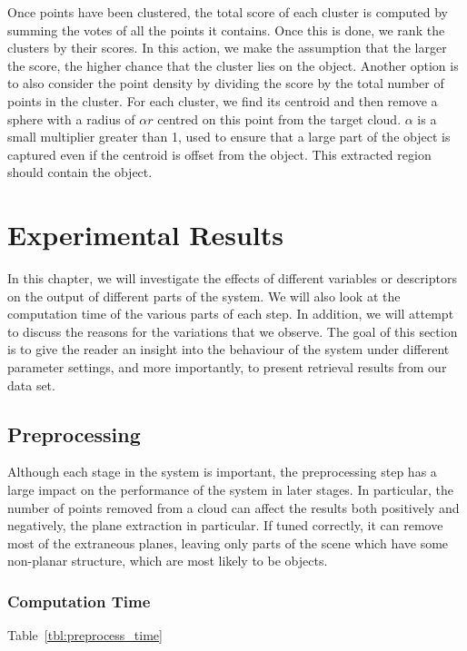 \documentclass[11pt,a4paper]{kth-mag}
\begin{document}
Once points have been clustered, the total score of each cluster is computed by
summing the votes of all the points it contains. Once this is done, we rank the
clusters by their scores. In this action, we make the assumption that the larger
the score, the higher chance that the cluster lies on the object. Another option
is to also consider the point density by dividing the score by the total number
of points in the cluster. For each cluster, we find its centroid and then remove
a sphere with a radius of $\alpha r$ centred on this point from the target
cloud. $\alpha$ is a small multiplier greater than 1, used to ensure that a
large part of the object is captured even if the centroid is offset from the
object. This extracted region should contain the object.
\chapter{Experimental Results}
\label{chap:exp}
In this chapter, we will investigate the effects of different variables or
descriptors on the output of different parts of the system. We will also look at
the computation time of the various parts of each step. In addition, we will
attempt to discuss the reasons for the variations that we observe. The goal of
this section is to give the reader an insight into the behaviour of the system
under different parameter settings, and more importantly, to present retrieval
results from our data set.

\section{Preprocessing}
Although each stage in the system is important, the preprocessing step has a
large impact on the performance of the system in later stages. In particular,
the number of points removed from a cloud can affect the results both positively
and negatively, the plane extraction in particular. If tuned correctly, it can
remove most of the extraneous planes, leaving only parts of the scene which have
some non-planar structure, which are most likely to be objects. 



\subsection{Computation Time}
Table~\ref{tbl:preprocess_time}
\end{document}
